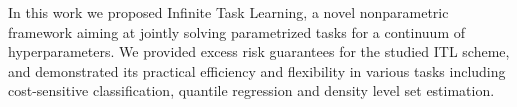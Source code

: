 In this work we proposed Infinite Task Learning, a novel nonparametric framework
aiming at jointly solving parametrized tasks for a continuum of
hyperparameters.
We provided
excess risk guarantees for the studied ITL scheme, and
demonstrated its practical efficiency and flexibility in various
tasks including cost-sensitive classification, quantile regression and density
     level set estimation.
%
